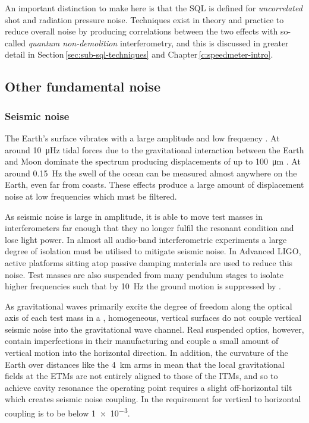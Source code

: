 An important distinction to make here is that the \gls{SQL} is defined for \emph{uncorrelated} shot and radiation pressure noise. Techniques exist in theory and practice to reduce overall noise by producing correlations between the two effects with so-called \emph{quantum non-demolition} interferometry, and this is discussed in greater detail in Section\,\ref{sec:sub-sql-techniques} and Chapter\,\ref{c:speedmeter-intro}.

\subsection{Other fundamental noise}

\subsubsection{\label{sec:seismic-noise}Seismic noise}
The Earth's surface vibrates with a large amplitude and low frequency \cite{ET2011}. At around \SI{10}{\micro\hertz} tidal forces due to the gravitational interaction between the Earth and Moon dominate the spectrum producing displacements of up to \SI{100}{\micro\meter} \cite{Adhikari2004}. At around \SI{0.15}{\hertz} the swell of the ocean can be measured almost anywhere on the Earth, even far from coasts. These effects produce a large amount of displacement noise at low frequencies which must be filtered.

As seismic noise is large in amplitude, it is able to move test masses in interferometers far enough that they no longer fulfil the resonant condition and lose light power. In almost all audio-band interferometric experiments a large degree of isolation must be utilised to mitigate seismic noise. In Advanced \gls{LIGO}, active platforms sitting atop passive damping materials are used to reduce this noise. Test masses are also suspended from many pendulum stages to isolate higher frequencies such that by \SI{10}{\hertz} the ground motion is suppressed by .

As gravitational waves primarily excite the degree of freedom along the optical axis of each test mass in a \MI{}, homogeneous, vertical surfaces do not couple vertical seismic noise into the gravitational wave channel. Real suspended optics, however, contain imperfections in their manufacturing and couple a small amount of vertical motion into the horizontal direction. In addition, the curvature of the Earth over distances like the \SI{4}{\kilo\meter} arms in \ALIGO{} mean that the local gravitational fields at the \glspl{ETM} are not entirely aligned to those of the \glspl{ITM}, and so to achieve cavity resonance the operating point requires a slight off-horizontal tilt which creates seismic noise coupling. In \ALIGO{} the requirement for vertical to horizontal coupling is to be below \num{1e-3}.

